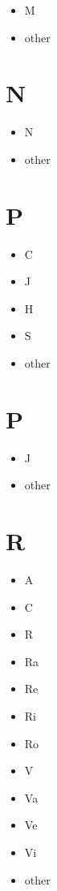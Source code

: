 \documentclass[
]{book}
\providecommand{\tightlist}{%
  \setlength{\itemsep}{0pt}\setlength{\parskip}{0pt}}
\begin{document}
\begin{itemize}
\tightlist
\item
  M
\item
  other
\end{itemize}

\hypertarget{n-1}{%
\section{N}\label{n-1}}

\begin{itemize}
\tightlist
\item
  N
\item
  other
\end{itemize}

\hypertarget{p}{%
\section{P}\label{p}}

\begin{itemize}
\tightlist
\item
  C
\item
  J
\item
  H
\item
  S
\item
  other
\end{itemize}

\hypertarget{p-1}{%
\section{P}\label{p-1}}

\begin{itemize}
\tightlist
\item
  J
\item
  other
\end{itemize}

\hypertarget{r}{%
\section{R}\label{r}}

\begin{itemize}
\tightlist
\item
  A
\item
  C
\item
  R
\item
  Ra
\item
  Re
\item
  Ri
\item
  Ro
\item
  V
\item
  Va
\item
  Ve
\item
  Vi
\item
  other
\end{itemize}
\end{document}

